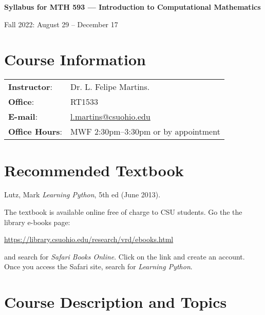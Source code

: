 \documentclass[12pt]{article}
\begin{document}
\sffamily

\begin{center}


\bigskip
{\large \textbf{Syllabus for MTH 593 --- Introduction to Computational Mathematics}}

Fall 2022: August 29 -- December 17
\end{center}

\section{Course Information}
\begin{tabular}{ll}
\textbf{Instructor}: & Dr. L. Felipe Martins.\\
\textbf{Office}: &  RT1533\\
\textbf{E-mail}: &  \href{mailto:l.martins@csuohio.edu}{l.martins@csuohio.edu}\\
\textbf{Office Hours}: & MWF 2:30pm--3:30pm or by appointment\\
\end{tabular}


\section{Recommended Textbook}

Lutz, Mark \emph{Learning Python}, 5th ed (June 2013).

The textbook is available online free of charge to CSU students. Go the the library e-books page:
\begin{center}
\url{https://library.csuohio.edu/research/vrd/ebooks.html}
\end{center}
and search for \emph{Safari Books Online}. Click on the link and create an account. Once you access the Safari site, search for \emph{Learning Python}.


\section{Course Description and Topics}
\end{document}
